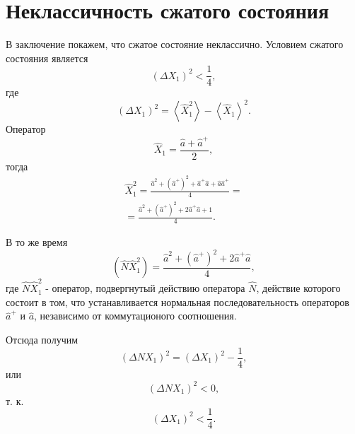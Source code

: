 \section{Неклассичность сжатого состояния}
В заключение покажем, что сжатое состояние неклассично. Условием
сжатого состояния является 
\begin{equation}
\left(\Delta X_1\right)^2 < \frac{1}{4},
\nonumber
\end{equation}
где 
\[
\left(\Delta X_1\right)^2 =
\left<\hat{X}_1^2\right> - 
\left<\hat{X}_1\right>^2.
\]
Оператор
\[
\hat{X}_1 = \frac{\hat{a} + \hat{a}^{+}}{2},
\]
тогда 
\begin{eqnarray}
\hat{X}_1^2 = \frac{\hat{a}^2 + \left(\hat{a}^{+}\right)^2 +
  \hat{a}^{+}\hat{a} + \hat{a} \hat{a}^{+}}{4} = 
\nonumber \\
=
\frac{\hat{a}^2 + \left(\hat{a}^{+}\right)^2 +
  2 \hat{a}^{+}\hat{a} + 1}{4}.
\nonumber
\end{eqnarray}

В то же время 
\[
\left(\hat{N}\hat{X}_1^2\right) = \frac{
\hat{a}^2 + \left(\hat{a}^{+}\right)^2 +
2 \hat{a}^{+}\hat{a}}{4},
\]
где $\hat{N}\hat{X}_1^2$ - оператор, подвергнутый действию оператора
$\hat{N}$, действие которого состоит в том, что устанавливается
нормальная последовательность операторов $\hat{a}^{+}$ и $\hat{a}$,
независимо от коммутационого соотношения.

Отсюда получим
\begin{equation}
\left(\Delta N X_1\right)^2 = 
\left(\Delta X_1\right)^2 - \frac{1}{4},
\nonumber
\end{equation}
или
\begin{equation}
\left(\Delta N X_1\right)^2 < 0,
\nonumber
\end{equation}
т. к. 
\[
\left(\Delta X_1\right)^2 < \frac{1}{4}.
\]

